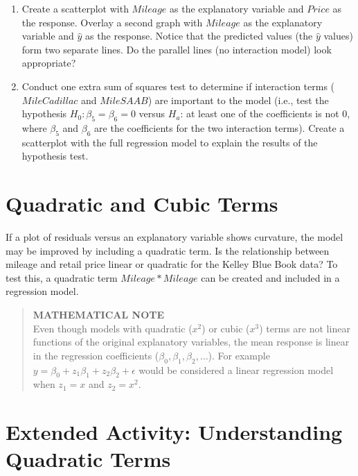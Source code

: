 \documentclass[
]{report}
\providecommand{\tightlist}{%
  \setlength{\itemsep}{0pt}\setlength{\parskip}{0pt}}
\begin{document}
\begin{enumerate}
\def\labelenumi{\alph{enumi}.}
\tightlist
\item
  Create a scatterplot with \(Mileage\) as the explanatory variable and \(Price\) as the response. Overlay a second graph with \(Mileage\) as the explanatory variable and \(\hat y\) as the response. Notice that the predicted values (the \(\hat y\) values) form two separate lines. Do the parallel lines (no interaction model) look appropriate?
\item
  Conduct one extra sum of squares test to determine if interaction terms (\(MileCadillac\) and \(MileSAAB\)) are important to the model (i.e., test the hypothesis \(H_0: \beta_5 = \beta_6 = 0\) versus \(H_a\): at least one of the coefficients is not 0, where \(\beta_5\) and \(\beta_6\) are the coefficients for the two interaction terms). Create a scatterplot with the full regression model to explain the results of the hypothesis test.
\end{enumerate}

\section*{Quadratic and Cubic Terms}\label{quadratic-and-cubic-terms}

If a plot of residuals versus an explanatory variable shows curvature, the model may be improved by including a quadratic term. Is the relationship between mileage and retail price linear or quadratic for the Kelley Blue Book data? To test this, a quadratic term \(Mileage*Mileage\) can be created and included in a regression model.

\begin{quote}
\textbf{MATHEMATICAL NOTE}\\
Even though models with quadratic (\(x^2\)) or cubic (\(x^3\)) terms are not linear functions of the original explanatory variables, the mean response is linear in the regression coefficients (\(\beta_0, \beta_1, \beta_2, \dots\)). For example \(y = \beta_0 + z_1 \beta_1 + z_2 \beta_2 + \epsilon\) would be considered a linear regression model when \(z_1 = x\) and \(z_2 = x^2\).
\end{quote}

\section*{Extended Activity: Understanding Quadratic Terms}\label{extended-activity-understanding-quadratic-terms}
\end{document}
